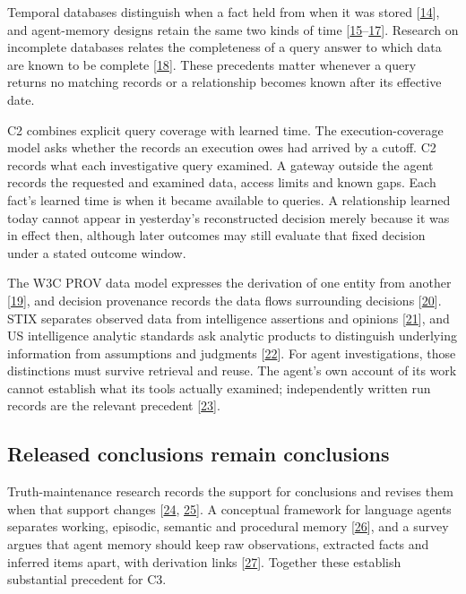 \documentclass[acmlarge,review,anonymous,nonacm]{acmart}
\begin{document}
Temporal databases distinguish when a fact held from when it was stored
{[}\protect\hyperlink{ref-Snodgrass1986Temporal}{14}{]}, and
agent-memory designs retain the same two kinds of time
{[}\protect\hyperlink{ref-Wang2026TOKI}{15}--\protect\hyperlink{ref-Dan2026Anamnesis}{17}{]}.
Research on incomplete databases relates the completeness of a query
answer to which data are known to be complete
{[}\protect\hyperlink{ref-Razniewski2011Completeness}{18}{]}. These
precedents matter whenever a query returns no matching records or a
relationship becomes known after its effective date.

C2 combines explicit query coverage with learned time. The
execution-coverage model asks whether the records an execution owes had
arrived by a cutoff. C2 records what each investigative query examined.
A gateway outside the agent records the requested and examined data,
access limits and known gaps. Each fact's learned time is when it became
available to queries. A relationship learned today cannot appear in
yesterday's reconstructed decision merely because it was in effect then,
although later outcomes may still evaluate that fixed decision under a
stated outcome window.

The W3C PROV data model expresses the derivation of one entity from
another {[}\protect\hyperlink{ref-W3C2013PROVDM}{19}{]}, and decision
provenance records the data flows surrounding decisions
{[}\protect\hyperlink{ref-Singh2019DecisionProvenance}{20}{]}. STIX
separates observed data from intelligence assertions and opinions
{[}\protect\hyperlink{ref-OASIS2021STIX}{21}{]}, and US intelligence
analytic standards ask analytic products to distinguish underlying
information from assumptions and judgments
{[}\protect\hyperlink{ref-ODNI2015ICD203}{22}{]}. For agent
investigations, those distinctions must survive retrieval and reuse. The
agent's own account of its work cannot establish what its tools actually
examined; independently written run records are the relevant precedent
{[}\protect\hyperlink{ref-Dai2026Hearsay}{23}{]}.

\hypertarget{released-conclusions-remain-conclusions}{%
\subsection{Released conclusions remain
conclusions}\label{released-conclusions-remain-conclusions}}

Truth-maintenance research records the support for conclusions and
revises them when that support changes
{[}\protect\hyperlink{ref-Doyle1979TMS}{24},
\protect\hyperlink{ref-Malheiro1994BeliefRevision}{25}{]}. A conceptual
framework for language agents separates working, episodic, semantic and
procedural memory {[}\protect\hyperlink{ref-Sumers2024CoALA}{26}{]}, and
a survey argues that agent memory should keep raw observations,
extracted facts and inferred items apart, with derivation links
{[}\protect\hyperlink{ref-Wang2026AgentTraces}{27}{]}. Together these
establish substantial precedent for C3.
\end{document}
